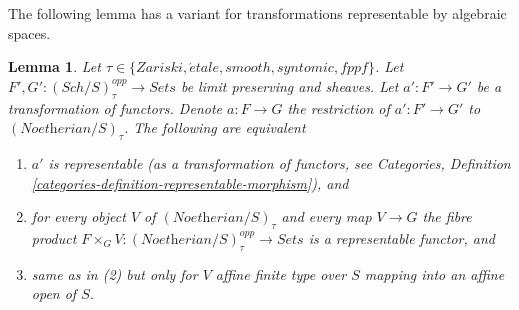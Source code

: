 \documentclass{stacks-project}
\theoremstyle{plain}
\newtheorem{lemma}[subsection]{Lemma}
\theoremstyle{definition}
\theoremstyle{remark}
\numberwithin{equation}{subsection}
\def\Sch{\mathit{Sch}}
\def\etale{{\acute{e}tale}}
\begin{document}
\noindent
The following lemma has a variant for transformations
representable by algebraic spaces.

\begin{lemma}
\label{lemma-representable}
Let $\tau \in \{Zariski, \etale, smooth, syntomic, fppf\}$.
Let $F', G' : (\Sch/S)_\tau^{opp} \to \textit{Sets}$ be limit preserving
and sheaves. Let $a' : F' \to G'$ be a transformation of functors.
Denote $a : F \to G$ the restriction of $a' : F' \to G'$ to
$(\textit{Noetherian}/S)_\tau$. The following are equivalent
\begin{enumerate}
\item $a'$ is representable (as a transformation of functors, see
Categories, Definition \ref{categories-definition-representable-morphism}), and
\item for every object $V$ of $(\textit{Noetherian}/S)_\tau$
and every map $V \to G$ the fibre product
$F \times_G V : (\textit{Noetherian}/S)_\tau^{opp} \to \textit{Sets}$
is a representable functor, and
\item same as in (2) but only for $V$ affine finite type over $S$
mapping into an affine open of $S$.
\end{enumerate}
\end{lemma}
\end{document}

